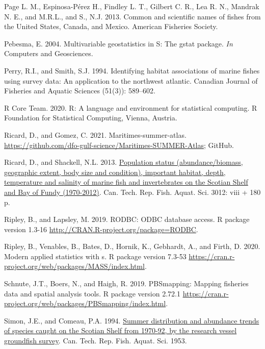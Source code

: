 \documentclass[12pt]{article}\usepackage[]{graphicx}\usepackage[]{color}
\begin{document}
\leavevmode\hypertarget{ref-page:etal:7thedition}{}%
Page L. M., Espinosa-Pérez H., Findley L. T., Gilbert C. R., Lea R. N., Mandrak N. E., and M.R.L., and S., N.J. 2013. Common and scientific names of fishes from the United States, Canada, and Mexico. American Fisheries Society.

\leavevmode\hypertarget{ref-R:package:gstat}{}%
Pebesma, E. 2004. Multivariable geostatistics in S: The gstat package. \emph{In} Computers and Geosciences.

\leavevmode\hypertarget{ref-Perry:Smith:1994:cjfas}{}%
Perry, R.I., and Smith, S.J. 1994. Identifying habitat associations of marine fishes using survey data: An application to the northwest atlantic. Canadian Journal of Fisheries and Aquatic Sciences (51(3)): 589--602.

\leavevmode\hypertarget{ref-R:2020}{}%
R Core Team. 2020. R: A language and environment for statistical computing. R Foundation for Statistical Computing, Vienna, Austria.

\leavevmode\hypertarget{ref-Ricard-Gomez-2021}{}%
Ricard, D., and Gomez, C. 2021. Maritimes-summer-atlas. \url{https://github.com/dfo-gulf-science/Maritimes-SUMMER-Atlas}; GitHub.

\leavevmode\hypertarget{ref-Ricard:MARatlas:2013}{}%
Ricard, D., and Shackell, N.L. 2013. \href{http://publications.gc.ca/site/eng/9.589947/publication.html}{Population status (abundance/biomass, geographic extent, body size and condition), important habitat, depth, temperature and salinity of marine fish and invertebrates on the Scotian Shelf and Bay of Fundy (1970-2012)}. Can. Tech. Rep. Fish. Aquat. Sci. 3012: viii + 180 p.

\leavevmode\hypertarget{ref-R:package:RODBC}{}%
Ripley, B., and Lapsley, M. 2019. RODBC: ODBC database access. R package version 1.3-16 \url{http://CRAN.R-project.org/package=RODBC}.

\leavevmode\hypertarget{ref-R:package:MASS}{}%
Ripley, B., Venables, B., Bates, D., Hornik, K., Gebhardt, A., and Firth, D. 2020. Modern applied statistics with s. R package version 7.3-53 \url{https://cran.r-project.org/web/packages/MASS/index.html}.

\leavevmode\hypertarget{ref-R:package:PBSmapping}{}%
Schnute, J.T., Boers, N., and Haigh, R. 2019. PBSmapping: Mapping fisheries data and spatial analysis tools. R package version 2.72.1 \url{https://cran.r-project.org/web/packages/PBSmapping/index.html}.

\leavevmode\hypertarget{ref-Simon:Comeau:1994}{}%
Simon, J.E., and Comeau, P.A. 1994. \href{http://publications.gc.ca/site/eng/46517/publication.html}{Summer distribution and abundance trends of species caught on the Scotian Shelf from 1970-92, by the research vessel groundfish survey}. Can. Tech. Rep. Fish. Aquat. Sci. 1953.
\end{document}
